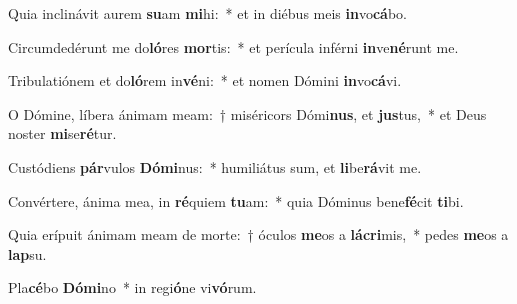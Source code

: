 \item Quia inclinávit aurem \textbf{su}am \textbf{mi}hi:~* et in diébus meis \textbf{in}vo\textbf{cá}bo.
\item Circumdedérunt me do\textbf{ló}res \textbf{mor}tis:~* et perícula inférni \textbf{in}ve\textbf{né}runt me.
\item Tribulatiónem et do\textbf{ló}rem in\textbf{vé}ni:~* et nomen Dómini \textbf{in}vo\textbf{cá}vi.
\item O Dómine, líbera ánimam meam:~† miséricors Dómi\textbf{nus}, et \textbf{jus}tus,~* et Deus noster \textbf{mi}se\textbf{ré}tur.
\item Custódiens \textbf{pár}vulos \textbf{Dó}\textbf{mi}nus:~* humiliátus sum, et \textbf{li}be\textbf{rá}vit me.
\item Convértere, ánima mea, in \textbf{ré}quiem \textbf{tu}am:~* quia Dóminus bene\textbf{fé}cit \textbf{ti}bi.
\item Quia erípuit ánimam meam de morte:~† óculos \textbf{me}os a \textbf{lá}\textbf{cri}mis,~* pedes \textbf{me}os a \textbf{lap}su.
\item Pla\textbf{cé}bo \textbf{Dó}\textbf{mi}no~* in regi\textbf{ó}ne vi\textbf{vó}rum.
